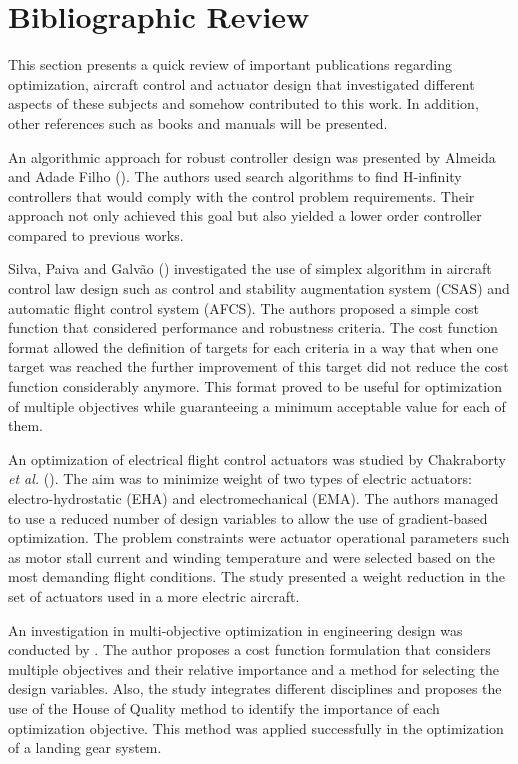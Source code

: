 \section{Bibliographic Review}

This section presents a quick review of important publications regarding optimization, aircraft control and actuator design that investigated different aspects of these subjects and somehow contributed to this work. In addition, other references such as books and manuals will be presented.

An algorithmic approach for robust controller design was presented by Almeida and Adade Filho (\citeyear{Almeida}). The authors used search algorithms to find H-infinity controllers that would comply with the control problem requirements. Their approach not only achieved this goal but also yielded a lower order controller compared to previous works. 

Silva, Paiva and Galv\~ao (\citeyear{Silva}) investigated the use of simplex algorithm in aircraft control law design such as control and stability augmentation system (CSAS) and automatic flight control system (AFCS). The authors proposed a simple cost function that considered performance and robustness criteria. The cost function format allowed the definition of targets for each criteria in a way that when one target was reached the further improvement of this target did not reduce the cost function considerably anymore. This format proved to be useful for optimization of multiple objectives while guaranteeing a minimum acceptable value for each of them.

An optimization of electrical flight control actuators was studied by Chakraborty \textit{et al.} (\citeyear{Chakraborty}). The aim was to minimize weight of two types of electric actuators: electro-hydrostatic (EHA) and electromechanical (EMA). The authors managed to use a reduced number of design variables to allow the use of gradient-based optimization. The problem constraints were actuator operational parameters such as motor stall current and winding temperature and were selected based on the most demanding flight conditions. The study presented a weight reduction in the set of actuators used in a more electric aircraft.

An investigation in multi-objective optimization in engineering design was conducted by . The author proposes a cost function formulation that considers multiple objectives and their relative importance and a method for selecting the design variables. Also, the study integrates different disciplines and proposes the use of the House of Quality method to identify the importance of each optimization objective. This method was applied successfully in the optimization of a landing gear system. 

